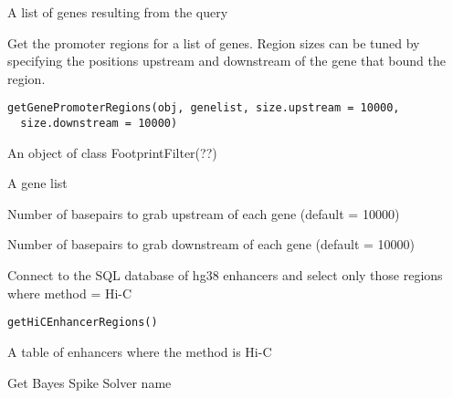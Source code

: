 \documentclass[a4paper]{book}
\begin{document}
%
\begin{Value}
A list of genes resulting from the query
\end{Value}
%
\begin{Description}\relax
Get the promoter regions for a list of genes. Region sizes can be tuned by specifying
the positions upstream and downstream of the gene that bound the region.
\end{Description}
%
\begin{Usage}
\begin{verbatim}
getGenePromoterRegions(obj, genelist, size.upstream = 10000,
  size.downstream = 10000)
\end{verbatim}
\end{Usage}
%
\begin{Arguments}
\begin{ldescription}
\item[\code{obj}] An object of class FootprintFilter(??)

\item[\code{genelist}] A gene list

\item[\code{size.upstream}] Number of basepairs to grab upstream of each gene (default = 10000)

\item[\code{size.downstream}] Number of basepairs to grab downstream of each gene (default = 10000)
\end{ldescription}
\end{Arguments}
%
\begin{Description}\relax
Connect to the SQL database of hg38 enhancers and select only those regions where method = Hi-C
\end{Description}
%
\begin{Usage}
\begin{verbatim}
getHiCEnhancerRegions()
\end{verbatim}
\end{Usage}
%
\begin{Value}
A table of enhancers where the method is Hi-C
\end{Value}
%
\begin{Description}\relax
Get Bayes Spike Solver name
\end{Description}
\end{document}

